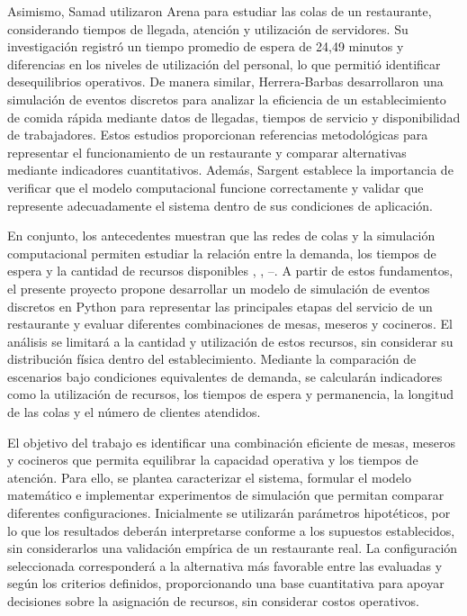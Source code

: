 \documentclass[10pt,a4paper,twocolumn]{article}
\begin{document}
Asimismo, Samad \cite{ref9} utilizaron Arena para estudiar las colas de un restaurante, considerando tiempos de llegada, atención y utilización de servidores. Su investigación registró un tiempo promedio de espera de 24,49 minutos y diferencias en los niveles de utilización del personal, lo que permitió identificar desequilibrios operativos. De manera similar, Herrera-Barbas \cite{ref10} desarrollaron una simulación de eventos discretos para analizar la eficiencia de un establecimiento de comida rápida mediante datos de llegadas, tiempos de servicio y disponibilidad de trabajadores. Estos estudios proporcionan referencias metodológicas para representar el funcionamiento de un restaurante y comparar alternativas mediante indicadores cuantitativos. Además, Sargent \cite{ref3} establece la importancia de verificar que el modelo computacional funcione correctamente y validar que represente adecuadamente el sistema dentro de sus condiciones de aplicación.

En conjunto, los antecedentes muestran que las redes de colas y la simulación computacional permiten estudiar la relación entre la demanda, los tiempos de espera y la cantidad de recursos disponibles \cite{ref2}, \cite{ref4}, \cite{ref8}–\cite{ref10}. A partir de estos fundamentos, el presente proyecto propone desarrollar un modelo de simulación de eventos discretos en Python para representar las principales etapas del servicio de un restaurante y evaluar diferentes combinaciones de mesas, meseros y cocineros. El análisis se limitará a la cantidad y utilización de estos recursos, sin considerar su distribución física dentro del establecimiento. Mediante la comparación de escenarios bajo condiciones equivalentes de demanda, se calcularán indicadores como la utilización de recursos, los tiempos de espera y permanencia, la longitud de las colas y el número de clientes atendidos.

El objetivo del trabajo es identificar una combinación eficiente de mesas, meseros y cocineros que permita equilibrar la capacidad operativa y los tiempos de atención. Para ello, se plantea caracterizar el sistema, formular el modelo matemático e implementar experimentos de simulación que permitan comparar diferentes configuraciones. Inicialmente se utilizarán parámetros hipotéticos, por lo que los resultados deberán interpretarse conforme a los supuestos establecidos, sin considerarlos una validación empírica de un restaurante real. La configuración seleccionada corresponderá a la alternativa más favorable entre las evaluadas y según los criterios definidos, proporcionando una base cuantitativa para apoyar decisiones sobre la asignación de recursos, sin considerar costos operativos.
\end{document}
